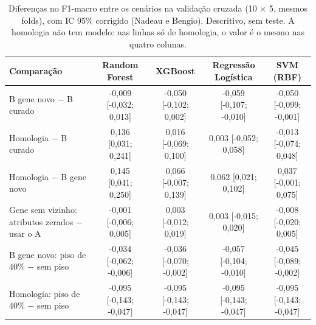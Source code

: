 \begin{table}[htbp]
  \centering
  \caption{Diferenças no F1-macro entre os cenários na validação cruzada (10 $\times$ 5, mesmos folds), com IC 95\% corrigido (Nadeau e Bengio). Descritivo, sem teste. A homologia não tem modelo: nas linhas só de homologia, o valor é o mesmo nas quatro colunas.}
  \label{tab:cenarios_cv}
  \begin{tabular}{lcccc}
    \toprule
    Comparação & Random Forest & XGBoost & Regressão Logística & SVM (RBF) \\
    \midrule
    B gene novo $-$ B curado & -0,009 [-0,032; 0,013] & -0,050 [-0,102; 0,002] & -0,059 [-0,107; -0,010] & -0,050 [-0,099; -0,001] \\
    Homologia $-$ B curado & 0,136 [0,031; 0,241] & 0,016 [-0,069; 0,100] & 0,003 [-0,052; 0,058] & -0,013 [-0,074; 0,048] \\
    Homologia $-$ B gene novo & 0,145 [0,041; 0,250] & 0,066 [-0,007; 0,139] & 0,062 [0,021; 0,102] & 0,037 [-0,001; 0,075] \\
    Gene sem vizinho: atributos zerados $-$ usar o A & -0,001 [-0,006; 0,005] & 0,003 [-0,012; 0,019] & 0,003 [-0,015; 0,020] & -0,008 [-0,020; 0,005] \\
    B gene novo: piso de 40\% $-$ sem piso & -0,034 [-0,062; -0,006] & -0,036 [-0,070; -0,002] & -0,057 [-0,104; -0,010] & -0,045 [-0,089; -0,002] \\
    Homologia: piso de 40\% $-$ sem piso & -0,095 [-0,143; -0,047] & -0,095 [-0,143; -0,047] & -0,095 [-0,143; -0,047] & -0,095 [-0,143; -0,047] \\
    \bottomrule
  \end{tabular}
\end{table}
